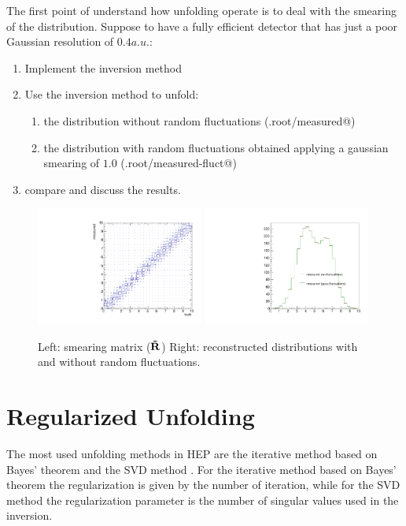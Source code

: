 \documentclass[a4paper,11pt]{article}
\begin{document}
The first point of understand how unfolding operate is to deal with the smearing of the distribution.
Suppose to have a fully efficient detector that has just a poor Gaussian resolution of $0.4 a.u.$:
\begin{enumerate}
	\item Implement the inversion method 
	\item Use the inversion method to unfold:
	\begin{enumerate}
		\item the distribution without random fluctuations (\verb@Exe.root/measured@)
		\item the distribution with random fluctuations obtained applying a gaussian smearing of $1.0$ (\verb@Exe.root/measured-fluct@)
	\end{enumerate}
	\item compare and discuss the results.
\end{enumerate}
\begin{figure}[H]
	\includegraphics[width=0.49\textwidth]{figs/respt.pdf}
	\includegraphics[width=0.49\textwidth]{figs/reco.pdf}
	\caption{
		\label{fig:exe1}
		Left: smearing matrix ($\mathbf{\tilde{R}}$) 
		Right: reconstructed distributions with and without random fluctuations.
	}	
\end{figure}
\FloatBarrier

\section{Regularized Unfolding}

The most used unfolding methods in \gls{HEP} are the iterative method based on Bayes' theorem \cite{dAgostini} and the \gls{SVD} method \cite{SVD}.
For the iterative method based on Bayes' theorem the regularization is given by the number of iteration, while for the \gls{SVD} method the regularization parameter is the number of singular values used in the inversion.
\end{document}
